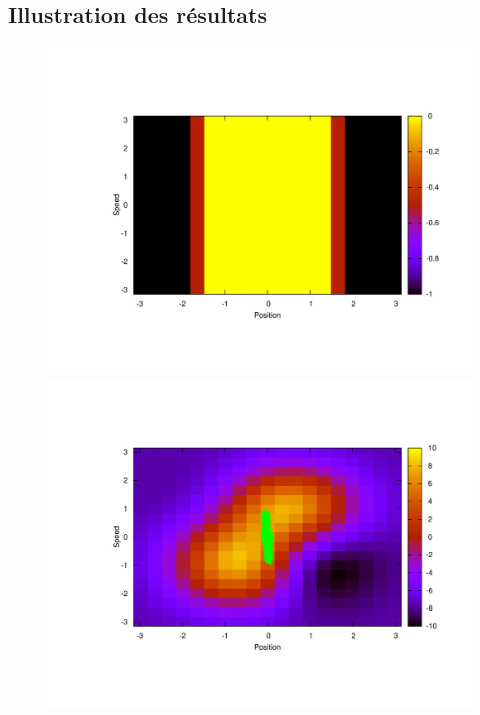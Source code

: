 \documentclass[publibook-draft]{CAp2012}
\begin{document}
\subsection{Illustration des résultats}
\begin{figure}
  \begin{minipage}[t]{.5\linewidth}
    \begin{center}
       \includegraphics[width=1.3\textwidth]{LAFEM_Exp3_true_R.pdf}
       \caption{}
       \label{trueR.fig}
    \end{center}
\end{minipage}
\hfill
\begin{minipage}[t]{.5\linewidth}
    \begin{center}
       \includegraphics[width=1.3\textwidth]{LAFEM_Exp3_lafem_R.pdf}

\end{center}
\end{minipage}
\end{figure}
\end{document}

